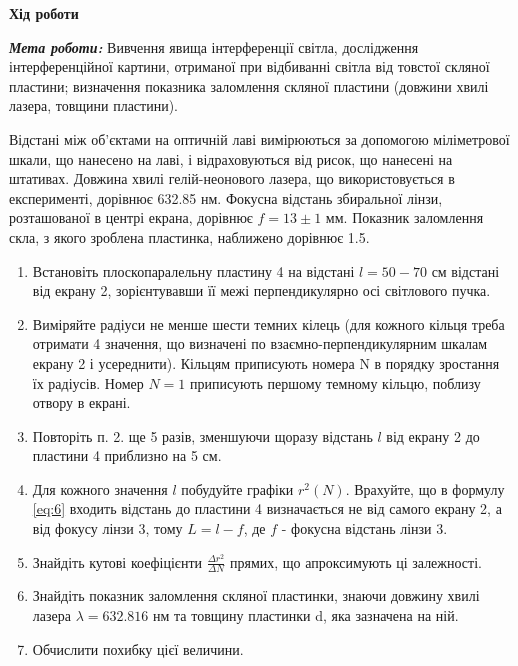 \begin{center}
    \Large{\textbf{Хід роботи}}    
\end{center}

\vspace{1mm}

\textit{\textbf{Мета роботи:}} Вивчення явища інтерференції світла, дослідження інтерференційної картини,
отриманої при відбиванні світла від товстої скляної пластини; визначення
показника заломлення скляної пластини (довжини хвилі лазера, товщини пластини).
\bigbreak


Відстані між об’єктами на оптичній лаві вимірюються за допомогою
міліметрової шкали, що нанесено на лаві, і відраховуються від рисок, 
що нанесені на штативах. Довжина хвилі гелій-неонового лазера, що 
використовується в експерименті, дорівнює 632.85 нм. Фокусна відстань
збиральної лінзи, розташованої в центрі екрана, дорівнює $f = 13 \pm 1$ мм.
Показник заломлення скла, з якого зроблена пластинка, наближено дорівнює 1.5.

\begin{enumerate}
    \item Встановіть плоскопаралельну пластину 4 на відстані $l = 50-70$ см відстані
    від екрану 2, зорієнтувавши її межі перпендикулярно осі світлового пучка.
    
    \item  Виміряйте радіуси не менше шести темних кілець (для кожного кільця
    треба отримати 4 значення, що визначені по взаємно-перпендикулярним
    шкалам екрану 2 і усереднити). Кільцям приписують номера N в порядку
    зростання їх радіусів. Номер $N = 1$ приписують першому темному кільцю,
    поблизу отвору в екрані.

    \item  Повторіть п. 2. ще 5 разів, зменшуючи щоразу відстань $l$ від екрану 2 до
    пластини 4 приблизно на 5 см.

    \item  Для кожного значення $l$ побудуйте графіки $r^2(N)$.
    Врахуйте, що в формулу \ref{eq:6} входить відстань до пластини 4 
    визначається не від самого екрану 2, а від фокусу лінзи 3, тому
    $L = l - f$, де $f$ - фокусна відстань лінзи 3.
    
    \item Знайдіть кутові коефіцієнти $\frac{\Delta r^2}{\Delta N}$ 
    прямих, що апроксимують ці залежності.

    \item Знайдіть показник заломлення скляної пластинки, знаючи довжину хвилі
    лазера $\lambda = 632.816$ нм та товщину пластинки d, яка зазначена на ній.
    
    \item  Обчислити похибку цієї величини.

\end{enumerate}